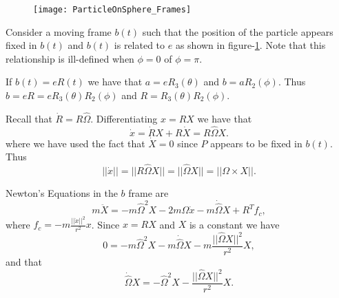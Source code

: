 \documentclass[graybox,envcountchap,sectrefs]{svmonoMuga}
\begin{document}
\begin{figure}[ht]
\begin{center}
\texttt{[image: ParticleOnSphere\_Frames]}
\renewcommand{\baselinestretch}{1}\selectfont
\caption{}
\label{Fig:ParticleOnSphere}
\renewcommand{\baselinestretch}{1.5}\selectfont
\end{center}
\end{figure}
Consider a moving frame $b(t)$ such that the position of the particle appears fixed in $b(t)$ and $b(t)$ is related to $e$ as shown in 
figure-\ref{Fig:ParticleOnSphere}. Note that this relationship is ill-defined when $\phi=0$ of $\phi=\pi$. 

If $b(t)=eR(t)$ we have that $a=eR_3{(\theta)}$ 
and $b=aR_2{(\phi)}$. Thus
$b=eR=eR_3{(\theta)}R_2{(\phi)}$ and $R=R_3{(\theta)}R_2{(\phi)}$.


Recall that $\dot{R}=R\widehat{\Omega}$. Differentiating $x=RX$ we  have that
\[
\dot{x}=\dot{R}X+R\dot{X}=R\widehat{\Omega}X.
\]
where we have used the fact that $\dot{X}=0$ since $P$ appears to be fixed in $b(t)$. Thus
\[
||\dot{x}||=||R\widehat{\Omega}X||=||\widehat{\Omega}X||=||\Omega\times X||.
\]


Newton's Equations in the $b$ frame are
\[
m\ddot{X}=-m\widehat{\Omega}^2X-2m\widehat{\Omega}\dot{x}-m\dot{\widehat{\Omega}}X+R^Tf_c,
\]
where
$f_c=-m\frac{||\dot{x}||^2}{r^2}x$. Since $x=RX$ and $X$ is a constant we have
\[
0=-m\widehat{\Omega}^2X-m\dot{\widehat{\Omega}}X-m\frac{||\widehat{\Omega}X||^2}{r^2}X,
\]
and that
\[
\dot{\widehat{\Omega}}X=-\widehat{\Omega}^2X-\frac{||\widehat{\Omega}X||^2}{r^2}X.
\]
\end{document}
